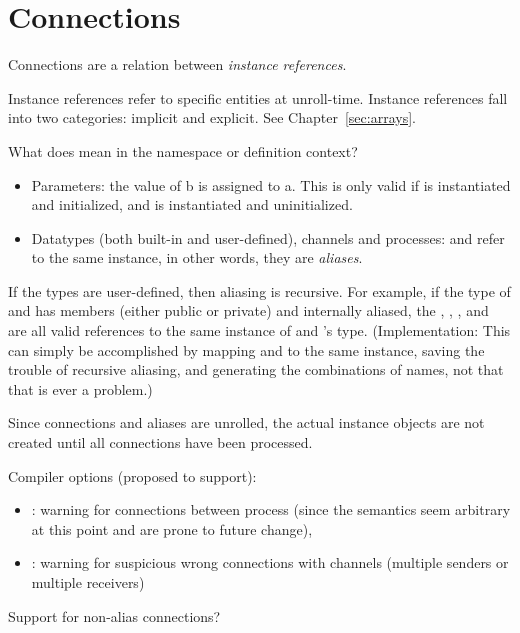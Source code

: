 

\chapter{Connections}
\label{sec:connections}

Connections are a relation between \emph{instance references}.  

Instance references refer to specific entities at unroll-time.  
Instance references fall into two categories: implicit and explicit.  
See Chapter~\ref{sec:arrays}.  

What does  mean in the namespace or definition context?

\begin{itemize}
\item Parameters: the value of b is assigned to a.
	This is only valid if  is instantiated and initialized, 
	and  is instantiated and uninitialized.  
\item Datatypes (both built-in and user-defined), channels and processes:
	 and  refer to the same instance, in other words, 
	they are \emph{aliases}.
\end{itemize}

If the types are user-defined, then aliasing is recursive.  
For example, if the type of  and  has 
members (either public or private)  and  internally aliased, 
the , , , and  are all 
valid references to the same instance of  and 's type.  
(Implementation:
This can simply be accomplished by mapping  and 
to the same instance, saving the trouble of recursive aliasing, 
and generating the combinations of names, 
not that that is ever a problem.)

Since connections and aliases are unrolled, the actual instance objects 
are not created until all connections have been processed.  

Compiler options (proposed to support):
\begin{itemize}
\item {}:
	warning for connections between process
	(since the semantics seem arbitrary at this point and 
	are prone to future change), 
\item {}: 
	warning for suspicious wrong connections with channels
	(multiple senders or multiple receivers)
\end{itemize}


Support for non-alias connections?

